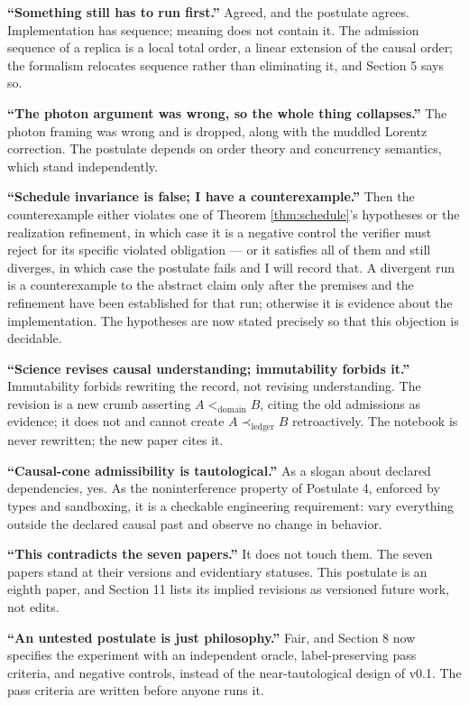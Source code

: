 \documentclass[11pt]{article}
\begin{document}
\textbf{``Something still has to run first.''} Agreed, and the postulate agrees. Implementation has sequence; meaning does not contain it. The admission sequence of a replica is a local total order, a linear extension of the causal order; the formalism relocates sequence rather than eliminating it, and Section 5 says so.

\textbf{``The photon argument was wrong, so the whole thing collapses.''} The photon framing was wrong and is dropped, along with the muddled Lorentz correction. The postulate depends on order theory and concurrency semantics, which stand independently.

\textbf{``Schedule invariance is false; I have a counterexample.''} Then the counterexample either violates one of Theorem \ref{thm:schedule}'s hypotheses or the realization refinement, in which case it is a negative control the verifier must reject for its specific violated obligation --- or it satisfies all of them and still diverges, in which case the postulate fails and I will record that. A divergent run is a counterexample to the abstract claim only after the premises and the refinement have been established for that run; otherwise it is evidence about the implementation. The hypotheses are now stated precisely so that this objection is decidable.

\textbf{``Science revises causal understanding; immutability forbids it.''} Immutability forbids rewriting the record, not revising understanding. The revision is a new crumb asserting $A <_{\mathrm{domain}} B$, citing the old admissions as evidence; it does not and cannot create $A \prec_{\mathrm{ledger}} B$ retroactively. The notebook is never rewritten; the new paper cites it.

\textbf{``Causal-cone admissibility is tautological.''} As a slogan about declared dependencies, yes. As the noninterference property of Postulate 4, enforced by types and sandboxing, it is a checkable engineering requirement: vary everything outside the declared causal past and observe no change in behavior.

\textbf{``This contradicts the seven papers.''} It does not touch them. The seven papers stand at their versions and evidentiary statuses. This postulate is an eighth paper, and Section 11 lists its implied revisions as versioned future work, not edits.

\textbf{``An untested postulate is just philosophy.''} Fair, and Section 8 now specifies the experiment with an independent oracle, label-preserving pass criteria, and negative controls, instead of the near-tautological design of v0.1. The pass criteria are written before anyone runs it.
\end{document}
